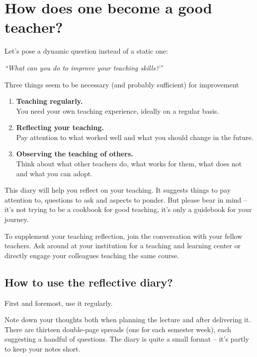 
\chapter*{How does one become a good teacher?}

\vspace*{1em}
Let's pose a dynamic question instead of a static one:

\vspace*{1em}
\textit{\large \enquote{What can you do to improve your teaching skills?}}

\vspace*{1em}
Three things seem to be necessary (and probably sufficient) for improvement\footnotemark
{}
\begin{enumerate}
\item \textbf{Teaching regularly.}\\You need your own teaching experience, ideally on a regular basis.
\item \textbf{Reflecting your teaching.}\\Pay attention to what worked well and what you should change in the future.
\item \textbf{Observing the teaching of others.}\\Think about what other teachers do, what works for them, what does not and what you can adopt.
\end{enumerate}

This diary will help you reflect on your teaching. It suggests things to pay attention to, questions to ask and aspects to ponder. But please bear in mind -- it's not trying to be a cookbook for good teaching, it's only a guidebook for your journey.

To supplement your teaching reflection, join the conversation with your fellow teachers. Ask around at your institution for a teaching and learning center or directly engage your colleagues teaching the same course.

\newpage
\section*{How to use the reflective diary?}

First and foremost, use it regularly.

Note down your thoughts both when planning the lecture and after delivering it. There are thirteen double-page spreads (one for each semester week), each suggesting a handful of questions. The diary is quite a small format -- it's partly to keep your notes short.

